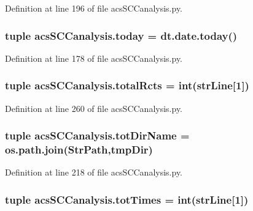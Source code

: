 Definition at line 196 of file acs\-S\-C\-Canalysis.\-py.

\hypertarget{a00096_a5498b0a6851ae4d3b2c3035093564e47}{
\subsubsection[{today}]{\setlength{\rightskip}{0pt plus 5cm}tuple acs\-S\-C\-Canalysis.\-today = dt.\-date.\-today()}}\label{a00096_a5498b0a6851ae4d3b2c3035093564e47}


Definition at line 178 of file acs\-S\-C\-Canalysis.\-py.

\hypertarget{a00096_a9f0e87ff21f3597668f5ad076224da87}{
\subsubsection[{total\-Rcts}]{\setlength{\rightskip}{0pt plus 5cm}tuple acs\-S\-C\-Canalysis.\-total\-Rcts = int({\bf str\-Line}\mbox{[}1\mbox{]})}}\label{a00096_a9f0e87ff21f3597668f5ad076224da87}


Definition at line 260 of file acs\-S\-C\-Canalysis.\-py.

\hypertarget{a00096_a5903034df3d32525785e697152efbeb3}{
\subsubsection[{tot\-Dir\-Name}]{\setlength{\rightskip}{0pt plus 5cm}tuple acs\-S\-C\-Canalysis.\-tot\-Dir\-Name = os.\-path.\-join({\bf Str\-Path},tmp\-Dir)}}\label{a00096_a5903034df3d32525785e697152efbeb3}


Definition at line 218 of file acs\-S\-C\-Canalysis.\-py.

\hypertarget{a00096_a20df40e09bc9514382d71f15783c7856}{
\subsubsection[{tot\-Times}]{\setlength{\rightskip}{0pt plus 5cm}tuple acs\-S\-C\-Canalysis.\-tot\-Times = int({\bf str\-Line}\mbox{[}1\mbox{]})}}\label{a00096_a20df40e09bc9514382d71f15783c7856}


